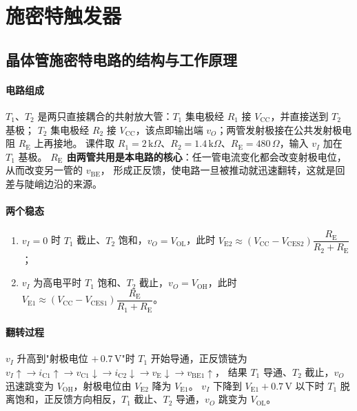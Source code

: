 \section{施密特触发器}
\subsection{晶体管施密特电路的结构与工作原理}
\paragraph{电路组成}
$T_1$、$T_2$ 是两只直接耦合的共射放大管：$T_1$ 集电极经 $R_1$ 接 $V_\text{CC}$，并直接送到 $T_2$ 基极；
$T_2$ 集电极经 $R_2$ 接 $V_\text{CC}$，该点即输出端 $v_O$；两管发射极接在公共发射极电阻 $R_\text{E}$ 上再接地。
课件取 $R_1=2\,\mathrm{k}\Omega$、$R_2=1.4\,\mathrm{k}\Omega$、$R_\text{E}=480\,\Omega$，输入 $v_I$ 加在 $T_1$ 基极。
\textbf{$R_\text{E}$ 由两管共用是本电路的核心}：任一管电流变化都会改变射极电位，从而改变另一管的 $v_\text{BE}$，
形成正反馈，使电路一旦被推动就迅速翻转，这就是回差与陡峭边沿的来源。

\paragraph{两个稳态}
\begin{enumerate}
    \item $v_I=0$ 时 $T_1$ 截止、$T_2$ 饱和，$v_O=V_\text{OL}$，此时
    $V_{\text{E}2}\approx\left(V_\text{CC}-V_\text{CES2}\right)\dfrac{R_\text{E}}{R_2+R_\text{E}}$；
    \item $v_I$ 为高电平时 $T_1$ 饱和、$T_2$ 截止，$v_O=V_\text{OH}$，此时
    $V_{\text{E}1}\approx\left(V_\text{CC}-V_\text{CES1}\right)\dfrac{R_\text{E}}{R_1+R_\text{E}}$。
\end{enumerate}

\paragraph{翻转过程}
$v_I$ 升高到"射极电位 $+\,0.7\,\mathrm{V}$"时 $T_1$ 开始导通，正反馈链为
$v_I\uparrow\rightarrow i_{\text{C}1}\uparrow\rightarrow v_{\text{C}1}\downarrow\rightarrow i_{\text{C}2}\downarrow
\rightarrow v_\text{E}\downarrow\rightarrow v_{\text{BE}1}\uparrow$，
结果 $T_1$ 导通、$T_2$ 截止，$v_O$ 迅速跳变为 $V_\text{OH}$，射极电位由 $V_{\text{E}2}$ 降为 $V_{\text{E}1}$。
$v_I$ 下降到 $V_{\text{E}1}+0.7\,\mathrm{V}$ 以下时 $T_1$ 脱离饱和，正反馈方向相反，$T_1$ 截止、$T_2$ 导通，$v_O$ 跳变为 $V_\text{OL}$。

